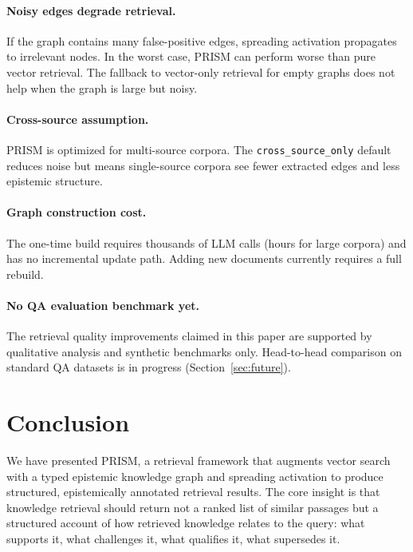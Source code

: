 \documentclass[11pt,a4paper]{article}
\begin{document}
\paragraph{Noisy edges degrade retrieval.}
If the graph contains many false-positive edges, spreading activation
propagates to irrelevant nodes. In the worst case, PRISM can perform
worse than pure vector retrieval. The fallback to vector-only retrieval
for empty graphs does not help when the graph is large but noisy.

\paragraph{Cross-source assumption.}
PRISM is optimized for multi-source corpora. The \texttt{cross\_source\_only}
default reduces noise but means single-source corpora see fewer extracted
edges and less epistemic structure.

\paragraph{Graph construction cost.}
The one-time build requires thousands of LLM calls (hours for large corpora)
and has no incremental update path. Adding new documents currently
requires a full rebuild.

\paragraph{No QA evaluation benchmark yet.}
The retrieval quality improvements claimed in this paper are supported by
qualitative analysis and synthetic benchmarks only. Head-to-head comparison
on standard QA datasets is in progress (Section~\ref{sec:future}).


\section{Conclusion}
\label{sec:conclusion}

We have presented PRISM, a retrieval framework that augments vector search
with a typed epistemic knowledge graph and spreading activation to produce
structured, epistemically annotated retrieval results. The core insight is
that knowledge retrieval should return not a ranked list of similar passages
but a structured account of how retrieved knowledge relates to the query:
what supports it, what challenges it, what qualifies it, what supersedes it.
\end{document}
